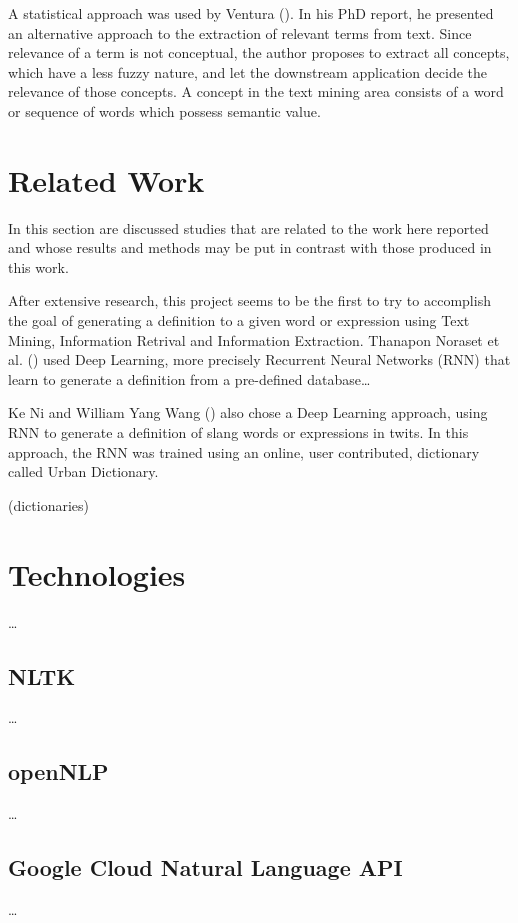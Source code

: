 A statistical approach was used by Ventura (\citeyear{ventura_2014}). 
In his PhD report, he presented an alternative approach to the extraction of relevant terms from text.
Since relevance of a term is not conceptual, the author proposes to extract all concepts, which have a less fuzzy nature, and let the downstream application decide the relevance of those concepts.
A concept in the text mining area consists of a word or sequence of words which possess semantic value.

\section{Related Work}

In this section are discussed studies that are related to the work here reported and whose results and methods may be put in contrast with those produced in this work.

After extensive research, this project seems to be the first to try to accomplish the goal of generating a definition to a given word or expression using Text Mining, Information Retrival and Information Extraction.
Thanapon Noraset et al. (\citeyear{noraset_2016}) used Deep Learning, more precisely Recurrent Neural Networks (RNN) that learn to generate a definition from a pre-defined database\dots

Ke Ni and William Yang Wang (\citeyear{ni_2017}) also chose a Deep Learning approach, using RNN to generate a definition of slang words or expressions in twits.
In this approach, the RNN was trained using an online, user contributed, dictionary called Urban Dictionary.

(dictionaries)

\section{Technologies}

\dots

\subsection{NLTK}

\dots

\subsection{openNLP}

\dots

\subsection{Google Cloud Natural Language API}

\dots

